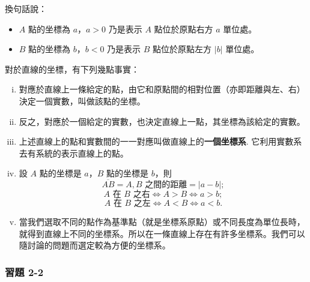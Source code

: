 換句話說：
\begin{itemize}
    \item[] $A$ 點的坐標為 $a$，$a>0$ 乃是表示 $A$ 點位於原點右方 $a$ 單位處。
    \item[] $B$ 點的坐標為 $b$，$b<0$ 乃是表示 $B$ 點位於原點左方 $|b|$ 單位處。
\end{itemize}

對於直線的坐標，有下列幾點事實：
\begin{enumerate}[(i)]
    \item 對應於直線上一條給定的點，由它和原點間的相對位置（亦即距離與左、右）決定一個實數，叫做該點的坐標。
    \item 反之，對應於一個給定的實數，也決定直線上一點，其坐標為該給定的實數。
    \item 上述直線上的點和實數間的一一對應叫做直線上的\textbf{一個坐標系}. 它利用實數系去有系統的表示直線上的點。
    \item 設 $A$ 點的坐標是 $a$，$B$ 點的坐標是 $b$，則
    \[
    \overline{AB} = A, B \text{ 之間的距離} = |a-b|;
    \]
    \[
    A \text{ 在 } B \text{ 之右} \iff A>B \iff a>b;
    \]
    \[
    A \text{ 在 } B \text{ 之左} \iff A<B \iff a<b.
    \]
    \item 當我們選取不同的點作為基準點（就是坐標系原點）或不同長度為單位長時，就得到直線上不同的坐標系。所以在一條直線上存在有許多坐標系。我們可以隨討論的問題而選定較為方便的坐標系。
\end{enumerate}

\subsubsection*{習題 2-2}

